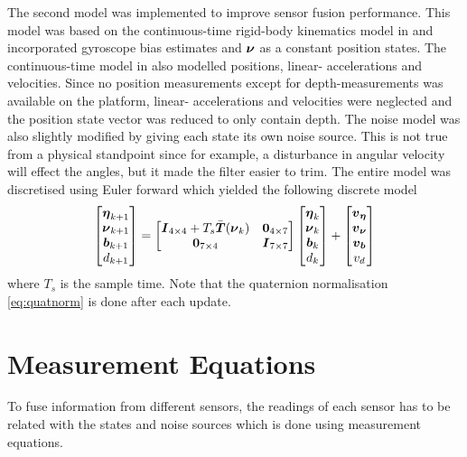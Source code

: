 The second model was implemented to improve sensor fusion performance. This model was based on the continuous-time rigid-body kinematics model in \citet[p. 351]{sensorfusion} and incorporated gyroscope bias estimates and $\boldsymbol{\nu}$ as a constant position states. The continuous-time model in \citet[p. 351]{sensorfusion} also modelled positions, linear- accelerations and velocities. Since no position measurements except for depth-measurements was available on the \abbrROV platform, linear- accelerations and velocities were neglected and the position state vector was reduced to only contain depth. The noise model was also slightly modified by giving each state its own noise source. This is not true from a physical standpoint since for example, a disturbance in angular velocity will effect the angles, but it made the filter easier to trim. The entire model was discretised using Euler forward which yielded the following discrete model
\begin{equation}\label{eq:expanded_model}
\begin{bmatrix}
\boldsymbol{\eta}_{k+1}\\
\boldsymbol{\nu}_{k+1}\\
\boldsymbol{b}_{k+1}\\
d_{k+1}
\end{bmatrix}=
\begin{bmatrix}
\boldsymbol{I}_{4\times4} + T_s \bar{\boldsymbol{T}}(\boldsymbol{\nu}_{k})& \boldsymbol{0}_{4\times7}\\
\boldsymbol{0}_{7\times4} & \boldsymbol{I}_{7\times7}\\
\end{bmatrix}
\begin{bmatrix}
\boldsymbol{\eta}_{k}\\
\boldsymbol{\nu}_{k}\\
\boldsymbol{b}_{k}\\
d_{k}
\end{bmatrix}
+\begin{bmatrix}
  \boldsymbol{v}_{\boldsymbol{\eta}}\\
  \boldsymbol{v}_{\boldsymbol{\nu}}\\
  \boldsymbol{v}_{\boldsymbol{b}}\\
  v_d 
\end{bmatrix}
\end{equation}
where $T_s$ is the sample time.
Note that the quaternion normalisation \eqref{eq:quatnorm} is done after each update.
\section{Measurement Equations}\label{sec:Meas}
To fuse information from different sensors, the readings of each sensor has to be related with the states and noise sources which is done using measurement equations.

